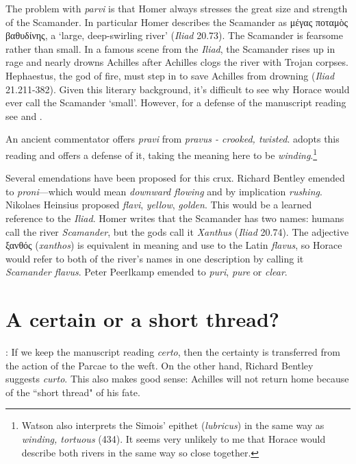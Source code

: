 The problem with \textit{parvi} is that Homer always stresses the great size and strength of the Scamander.  In particular Homer describes the Scamander as μέγας ποταμὸς βαθυδίνης, a `large, deep-swirling river' (\textit{Iliad} 20.73).  The Scamander is fearsome rather than small.  In a famous scene from the \textit{Iliad}, the Scamander rises up in rage and nearly drowns Achilles after Achilles clogs the river with Trojan corpses.  Hephaestus, the god of fire, must step in to save Achilles from drowning (\textit{Iliad} 21.211-382).  Given this literary background, it's difficult to see why Horace would ever call the Scamander `small'.  However, for a defense of the manuscript reading see \citet[223--224]{mankin1995} and \citet[207--209]{gaskin2013}.

An ancient commentator offers \textit{pravi} from \textit{pravus - crooked, twisted}.  \citet[433--434]{watson2003} adopts this reading and offers a defense of it, taking the meaning here to be \textit{winding}.\footnote{Watson also interprets the Simois' epithet (\textit{lubricus}) in the same way as \textit{winding, tortuous} (434).  It seems very unlikely to me that Horace would describe both rivers in the same way so close together.}

Several emendations have been proposed for this crux.  Richard Bentley emended to \textit{proni}---which would mean \textit{downward flowing} and by implication \textit{rushing}.  Nikolaes Heinsius proposed \textit{flavi}, \textit{yellow}, \textit{golden}.  This would be a learned reference to the \textit{Iliad}.  Homer writes that the Scamander has two names: humans call the river \textit{Scamander}, but the gods call it \textit{Xanthus} (\textit{Iliad} 20.74).  The adjective ξανθός (\textit{xanthos}) is equivalent in meaning and use to the Latin \textit{flavus}, so  Horace would refer to both of the river's names in one description by calling it \textit{Scamander flavus}.  Peter Peerlkamp emended to \textit{puri}, \textit{pure} or \textit{clear}.


\section*{A certain or a short thread?}


: If we keep the manuscript reading \textit{certo}, then the certainty is transferred from the action of the Parcae to the weft.  On the other hand, Richard Bentley suggests \textit{curto}.  This also makes good sense: Achilles will not return home because of the ``short thread" of his fate.

